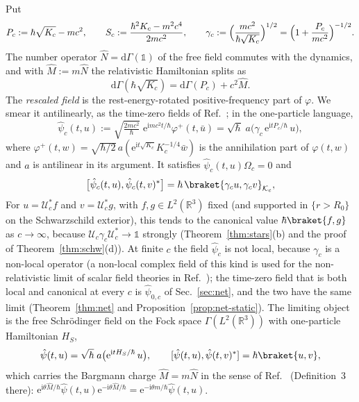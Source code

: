 \documentclass[%
 aip,
 jmp,
 amsmath,amssymb,
 reprint, onecolumn
]{revtex4-1}
\theoremstyle{definition}
\theoremstyle{remark}
\newcommand{\R}{\mathbb{R}}
\newcommand{\K}{\mathcal{K}}
\newcommand{\one}{\mathds{1}}
\newcommand{\rmd}{\mathrm{d}}
\newcommand{\rmi}{\mathrm{i}}
\newcommand{\rme}{\mathrm{e}}
\begin{document}
Put
\begin{equation}\label{eq:Pc-Sc}
P_c:=\hbar\sqrt{K_c}-mc^2,\qquad
S_c:=\frac{\hbar^2K_c-m^2c^4}{2mc^2},\qquad
\gamma_c:=\Bigl(\frac{mc^2}{\hbar\sqrt{K_c}}\Bigr)^{1/2}
=\Bigl(1+\frac{P_c}{mc^2}\Bigr)^{-1/2}.
\end{equation}
The number operator $\hat N=\rmd\Gamma(\one)$ of the free field commutes
with the dynamics, and with $\hat M:=m\hat N$ the relativistic
Hamiltonian splits as
\begin{equation}\label{eq:rest-energy-split}
\rmd\Gamma(\hbar\sqrt{K_c})=\rmd\Gamma(P_c)+c^2\hat M .
\end{equation}
The \emph{rescaled field} is the rest-energy-rotated positive-frequency
part of $\varphi$. We smear it antilinearly, as the time-zero fields of
Ref.~; in
the one-particle language,
\begin{equation}\label{eq:rescaled-field}
\hat\psi_c(t,u):=\sqrt{\tfrac{2mc^2}{\hbar}}\;\rme^{\rmi mc^2t/\hbar}
\varphi^+(t,\bar u)=\sqrt\hbar\;a\bigl(\gamma_c\,\rme^{\rmi tP_c/\hbar}\,u\bigr),
\end{equation}
where $\varphi^+(t,w)=\sqrt{\hbar/2}\,a(\rme^{\rmi t\sqrt{K_c}}
K_c^{-1/4}\bar w)$ is the annihilation part of $\varphi(t,w)$ and $a$ is
antilinear in its argument. It satisfies $\hat\psi_c(t,u)\Omega_c=0$ and
\[
\bigl[\hat\psi_c(t,u),\hat\psi_c(t,v)^*\bigr]=\hbar\,
\braket{\gamma_cu,\gamma_cv}_{\K_c},
\]
For $u=\mathcal{U}_c^*f$ and $v=\mathcal{U}_c^*g$, with $f,g\in
L^2(\R^3)$ fixed (and supported in $\{r>R_0\}$ on the Schwarzschild
exterior), this tends to the canonical value $\hbar\braket{f,g}$ as
$c\to\infty$, because $\mathcal{U}_c\gamma_c\mathcal{U}_c^*\to\one$
strongly (Theorem~\ref{thm:stars}(b) and the proof of
Theorem~\ref{thm:schw}(d)). At finite $c$ the
field
$\hat\psi_c$ is not local, because $\gamma_c$ is a non-local operator
(a non-local complex field of this kind is used for the non-relativistic
limit of scalar field theories in Ref.~);
the time-zero field that is both local and canonical at every $c$ is
$\hat\psi_{0,c}$ of Sec.~\ref{sec:net}, and the two have the same limit
(Theorem~\ref{thm:net} and Proposition~\ref{prop:net-static}).
The limiting object is the free Schr\"odinger field on the Fock space
$\Gamma(L^2(\R^3))$ with one-particle Hamiltonian $H_S$,
\begin{equation}\label{eq:limit-field}
\hat\psi(t,u)=\sqrt\hbar\;a\bigl(\rme^{\rmi tH_S/\hbar}\,u\bigr),\qquad
[\hat\psi(t,u),\hat\psi(t,v)^*]=\hbar\braket{u,v},
\end{equation}
which carries the Bargmann charge $\hat M=m\hat N$ in the sense of
Ref.~
(Definition~3 there): $\rme^{\rmi\theta\hat M/\hbar}\hat\psi(t,u)
\rme^{-\rmi\theta\hat M/\hbar}=\rme^{-\rmi\theta m/\hbar}\hat\psi(t,u)$.
\end{document}
